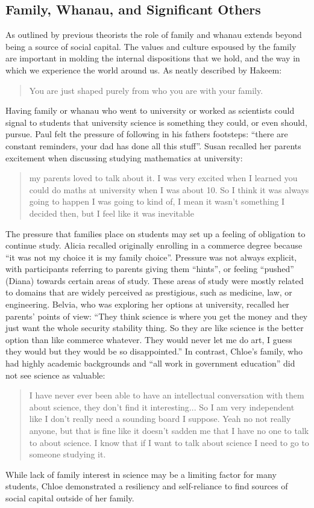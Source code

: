 \subsection{Family, Whanau, and Significant Others}
As outlined by previous theorists \citep{bourdieu1992invitation,Dimaggio1982,Archer_2013,Nash1999} the role of family and whanau extends beyond being a source of social capital. The values and culture espoused by the family are important in molding the internal dispositions that we hold, and the way in which we experience the world around us. As neatly described by Hakeem: \blockquote{You are just shaped purely from who you are with your family.} Having family or whanau who went to university or worked as scientists could signal to students that university science is something they could, or even should, pursue.  Paul felt the pressure of following in his fathers footsteps: ``there are constant reminders, your dad has done all this stuff''. Susan recalled her parents excitement when discussing studying mathematics at university: \blockquote{my parents loved to talk about it. I was very excited when I learned you could do maths at university when I was about 10. So I think it was always going to happen I was going to kind of, I mean it wasn't something I decided then, but I feel like it was inevitable}. 

The pressure that families place on students may set up a feeling of obligation to continue study. Alicia recalled originally enrolling in a commerce degree because ``it was not my choice it is my family choice''. Pressure was not always explicit, with participants referring to parents giving them ``hints'', or feeling ``pushed'' (Diana) towards certain areas of study. These areas of study were mostly related to domains that are widely perceived as prestigious, such as medicine, law, or engineering. Belvia, who was exploring her options at university, recalled her parents' points of view: ``They think science is where you get the money and they just want the whole security stability thing. So they are like science is the better option than like commerce whatever. They would never let me do art, I guess they would but they would be so disappointed.'' In contrast, Chloe's family, who had highly academic backgrounds and ``all work in government education'' did not see science as valuable: \blockquote{I have never ever been able to have an intellectual conversation with them about science, they don't find it interesting... So I am very independent like I don’t really need a sounding board I suppose. Yeah no not really anyone, but that is fine like it doesn't sadden me that I have no one to talk to about science. I know that if I want to talk about science I need to go to someone studying it.} While lack of family interest in science may be a limiting factor for many students, Chloe  demonstrated a resiliency and self-reliance to find sources of social capital outside of her family.

